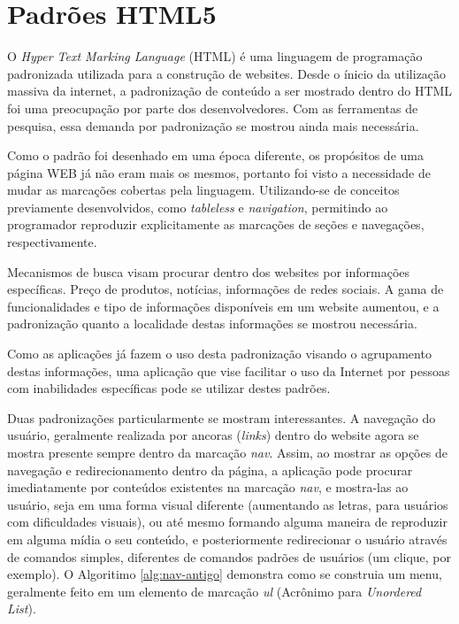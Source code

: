 \documentclass[
	12pt,				%
	oneside,			%
	a4paper,			%
	english,			%
	brazil				%
	]{abntex2ppgsi}
\begin{document}
\section{Padrões HTML5}

O \textit{Hyper Text Marking Language} (HTML) é uma linguagem de programação padronizada utilizada para a construção de websites. Desde o ínicio da utilização massiva da internet, a padronização de conteúdo a ser mostrado dentro do HTML foi uma preocupação por parte dos desenvolvedores. Com as ferramentas de pesquisa, essa demanda por padronização se mostrou ainda mais necessária.

Como o padrão foi desenhado em uma época diferente, os propósitos de uma página WEB já não eram mais os mesmos, portanto foi visto a necessidade de mudar as marcações cobertas pela linguagem. Utilizando-se de conceitos previamente desenvolvidos, como \textit{tableless} \cite{tableless} e \textit{navigation}, permitindo ao programador reproduzir explicitamente as marcações de seções e navegações, respectivamente. 

Mecanismos de busca visam procurar dentro dos websites por informações específicas. Preço de produtos, notícias, informações de redes sociais. A gama de funcionalidades e tipo de informações disponíveis em um website aumentou, e a padronização quanto a localidade destas informações se mostrou necessária. 

Como as aplicações já fazem o uso desta padronização visando o agrupamento destas informações, uma aplicação que vise facilitar o uso da Internet por pessoas com inabilidades específicas pode se utilizar destes padrões. 

Duas padronizações particularmente se mostram interessantes. A navegação do usuário, geralmente realizada por ancoras (\textit{links}) dentro do website agora se mostra presente sempre dentro da marcação \textit{nav}. Assim, ao mostrar as opções de navegação e redirecionamento dentro da página, a aplicação pode procurar imediatamente por conteúdos existentes na marcação \textit{nav}, e mostra-las ao usuário, seja em uma forma visual diferente (aumentando as letras, para usuários com dificuldades visuais), ou até mesmo formando alguma maneira de reproduzir em alguma mídia o seu conteúdo, e posteriormente redirecionar o usuário através de comandos simples, diferentes de comandos padrões de usuários (um clique, por exemplo). O Algoritimo \ref{alg:nav-antigo} demonstra como se construia um menu, geralmente feito em um elemento de marcação \textit{ul} (Acrônimo para \textit{Unordered List}). 
\end{document}
